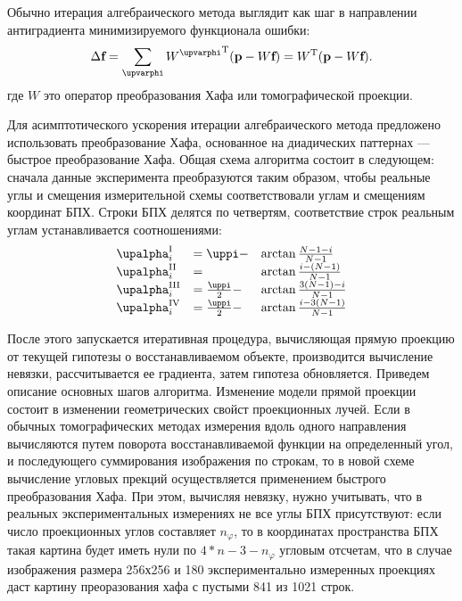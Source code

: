 Обычно итерация алгебраического метода выглядит как шаг в направлении антиградиента минимизируемого функционала ошибки:
\begin{equation}\notag
  \Delta \textbf f = \sum_\varphi {{W^\varphi}^{\mathrm T}(\textbf p - W\textbf f) } = W^{\mathrm T}(\textbf p - W \textbf f).
\end{equation}
где $W$ это оператор преобразования Хафа или томографической проекции.
  
Для асимптотического ускорения итерации алгебраического метода предложено использовать преобразование Хафа, основанное на диадических паттернах --- быстрое преобразование Хафа.
Общая схема алгоритма состоит в следующем: сначала данные эксперимента преобразуются таким образом, чтобы реальные углы и смещения измерительной схемы соответствовали углам и смещениям координат БПХ.
Строки БПХ делятся по четвертям, соответствие строк реальным углам устанавливается соотношениями:
\begin{equation} \notag
\begin{array}{lll}
\alpha^\rom{1}_i &= \pi - & \arctan{\frac{N-1-i}{N-1}} \\
\alpha^\rom{2}_i &= &\arctan{\frac{i - (N-1)}{N-1}} \\
\alpha^\rom{3}_i &= \frac \pi 2 - & \arctan{\frac{3(N-1)-i}{N-1}} \\
\alpha^\rom{4}_i &= \frac \pi 2 - & \arctan{\frac{i - 3(N-1)}{N-1}}
\end{array}
\end{equation}


После этого запускается итеративная процедура, вычисляющая прямую проекцию от текущей гипотезы о восстанавливаемом объекте, производится вычисление невязки, рассчитывается ее градиента, затем гипотеза обновляется.
Приведем описание основных шагов алгоритма.
Изменение модели прямой проекции состоит в изменении геометрических свойст проекционных лучей. 
Если в обычных томографических методах измерения вдоль одного направления вычисляются путем поворота восстанавливаемой функции на определенный угол, и последующего суммирования изображения по строкам, то в новой схеме вычисление угловых прекций осуществляется применением быстрого преобразования Хафа.
При этом, вычисляя невязку, нужно учитывать, что в реальных экспериментальных измерениях не все углы БПХ присутствуют: если число проекционных углов составляет $n_\varphi$, то в координатах пространства БПХ такая картина будет иметь нули по $4 * n - 3 - n_\varphi$ угловым отсчетам, что в случае изображения размера 256х256 и 180 экспериментально измеренных проекциях даст картину преоразования хафа с пустыми 841 из 1021 строк.

